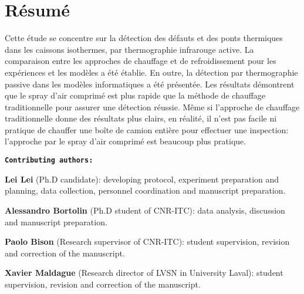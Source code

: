 \section*{Résumé}
Cette étude se concentre sur la détection des défauts et des ponts thermiques dans les caissons isothermes, par thermographie infrarouge active. La comparaison entre les approches de chauffage et de refroidissement pour les expériences et les modèles a été établie. En outre, la détection par thermographie passive dans les modèles informatiques a été présentée. Les résultats démontrent que le spray d'air comprimé est plus rapide que la méthode de chauffage traditionnelle pour assurer une détection réussie. Même si l'approche de chauffage traditionnelle donne des résultats plus clairs, en réalité, il n'est pas facile ni pratique de chauffer une boîte de camion entière pour effectuer une inspection: l'approche par le spray d'air comprimé est beaucoup plus pratique.

\textbf{\texttt{Contributing authors:}}

\textbf{\textsf{Lei Lei}} (Ph.D candidate): developing protocol, experiment preparation and planning, data collection, personnel coordination and manuscript preparation.

\textbf{Alessandro Bortolin} (Ph.D student of CNR-ITC): data analysis, discussion and manuscript preparation.

\textbf{Paolo Bison} (Research supervisor of CNR-ITC): student supervision, revision and correction of the manuscript. 

\textbf{Xavier Maldague} (Research director of LVSN in University Laval): student supervision, revision and correction of the manuscript. 




